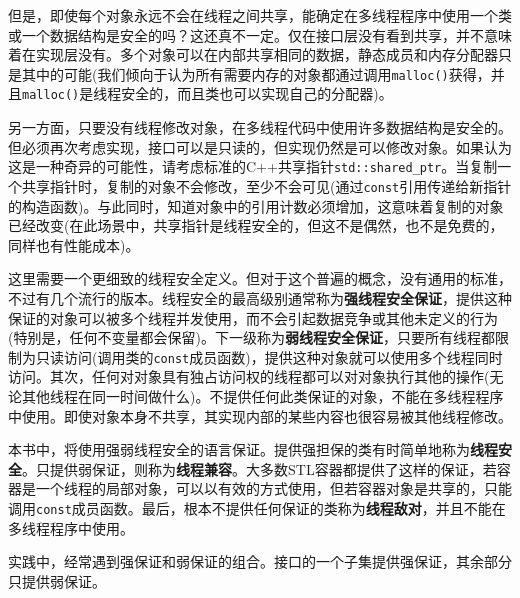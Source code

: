 但是，即使每个对象永远不会在线程之间共享，能确定在多线程程序中使用一个类或一个数据结构是安全的吗？这还真不一定。仅在接口层没有看到共享，并不意味着在实现层没有。多个对象可以在内部共享相同的数据，静态成员和内存分配器只是其中的可能(我们倾向于认为所有需要内存的对象都通过调用\texttt{malloc()}获得，并且\texttt{malloc()}是线程安全的，而且类也可以实现自己的分配器)。

另一方面，只要没有线程修改对象，在多线程代码中使用许多数据结构是安全的。但必须再次考虑实现，接口可以是只读的，但实现仍然是可以修改对象。如果认为这是一种奇异的可能性，请考虑标准的C++共享指针\texttt{std::shared\_ptr}。当复制一个共享指针时，复制的对象不会修改，至少不会可见(通过\texttt{const}引用传递给新指针的构造函数)。与此同时，知道对象中的引用计数必须增加，这意味着复制的对象已经改变(在此场景中，共享指针是线程安全的，但这不是偶然，也不是免费的，同样也有性能成本)。

这里需要一个更细致的线程安全定义。但对于这个普遍的概念，没有通用的标准，不过有几个流行的版本。线程安全的最高级别通常称为\textbf{强线程安全保证}，提供这种保证的对象可以被多个线程并发使用，而不会引起数据竞争或其他未定义的行为(特别是，任何不变量都会保留)。下一级称为\textbf{弱线程安全保证}，只要所有线程都限制为只读访问(调用类的\texttt{const}成员函数)，提供这种对象就可以使用多个线程同时访问。其次，任何对对象具有独占访问权的线程都可以对对象执行其他的操作(无论其他线程在同一时间做什么)。不提供任何此类保证的对象，不能在多线程程序中使用。即使对象本身不共享，其实现内部的某些内容也很容易被其他线程修改。

本书中，将使用强弱线程安全的语言保证。提供强担保的类有时简单地称为\textbf{线程安全}。只提供弱保证，则称为\textbf{线程兼容}。大多数STL容器都提供了这样的保证，若容器是一个线程的局部对象，可以以有效的方式使用，但若容器对象是共享的，只能调用\texttt{const}成员函数。最后，根本不提供任何保证的类称为\textbf{线程敌对}，并且不能在多线程程序中使用。

实践中，经常遇到强保证和弱保证的组合。接口的一个子集提供强保证，其余部分只提供弱保证。


